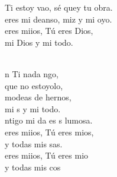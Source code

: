 \documentclass[12pt]{article}
\begin{document}
\begin{multicols*}{2}
\begin{cancion}
	 Ti estoy vao, sé quey tu obra. \\
	 eres mi deanso, miz y mi oyo.\\
	 eres miios, Tú eres Dios,\\
mi Dios y mi todo.\\\jump\\
	\begin{chorus}%
	n Ti nada ngo,\\
	 que no estoyolo,\\
	modeas de hernos, \\
	mi s y mi todo.\\
	ntigo mi da es s lumosa.\\
	 eres miios, Tú eres mios,\\
	y todas mis sas.\\
	 eres miios, Tú eres mio\\
	y todas mis cos\\
	\end{chorus}%
	\jump\\
	       \\
\end{cancion}%


\end{multicols*}
\end{document}
